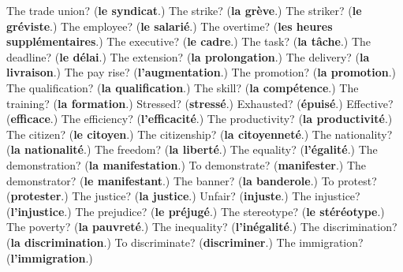 \begin{tcolorbox}[breakable,colback=teal!4,colframe=teal!35!black,title={Before you move on}]
The trade union? (\textbf{le syndicat}.) The strike? (\textbf{la grève}.) The striker? (\textbf{le gréviste}.) The employee? (\textbf{le salarié}.) The overtime? (\textbf{les heures supplémentaires}.) The executive? (\textbf{le cadre}.) The task? (\textbf{la tâche}.) The deadline? (\textbf{le délai}.) The extension? (\textbf{la prolongation}.) The delivery? (\textbf{la livraison}.) The pay rise? (\textbf{l'augmentation}.) The promotion? (\textbf{la promotion}.) The qualification? (\textbf{la qualification}.) The skill? (\textbf{la compétence}.) The training? (\textbf{la formation}.) Stressed? (\textbf{stressé}.) Exhausted? (\textbf{épuisé}.) Effective? (\textbf{efficace}.) The efficiency? (\textbf{l'efficacité}.) The productivity? (\textbf{la productivité}.) The citizen? (\textbf{le citoyen}.) The citizenship? (\textbf{la citoyenneté}.) The nationality? (\textbf{la nationalité}.) The freedom? (\textbf{la liberté}.) The equality? (\textbf{l'égalité}.) The demonstration? (\textbf{la manifestation}.) To demonstrate? (\textbf{manifester}.) The demonstrator? (\textbf{le manifestant}.) The banner? (\textbf{la banderole}.) To protest? (\textbf{protester}.) The justice? (\textbf{la justice}.) Unfair? (\textbf{injuste}.) The injustice? (\textbf{l'injustice}.) The prejudice? (\textbf{le préjugé}.) The stereotype? (\textbf{le stéréotype}.) The poverty? (\textbf{la pauvreté}.) The inequality? (\textbf{l'inégalité}.) The discrimination? (\textbf{la discrimination}.) To discriminate? (\textbf{discriminer}.) The immigration? (\textbf{l'immigration}.)
\end{tcolorbox}
